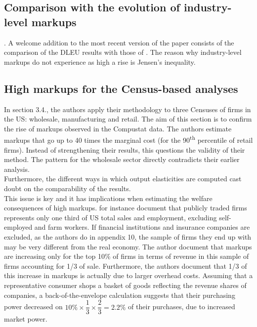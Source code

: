 \documentclass{amsart}
\theoremstyle{definition}
\theoremstyle{remark}
\numberwithin{equation}{section}
\begin{document}
\subsection*{Comparison with the evolution of industry-level markups}. A welcome addition to the most recent version of the paper consists of the comparison of the DLEU results with those of \cite{hall2018new}. The reason why industry-level markups do not experience as high a rise is Jensen's inequality.

\subsection*{High markups for the Census-based analyses} In section 3.4., the authors apply their methodology to three Censuses of firms in the US: wholesale, manufacturing and retail. The aim of this section is to confirm the rise of markups observed in the Compustat data. The authors estimate markups that go up to 40 times the marginal cost (for the 90\textsuperscript{th} percentile of retail firms). Instead of strengthening their results, this questions the validity of their method. The pattern for the wholesale sector directly contradicts their earlier analysis. \\

Furthermore, the different ways in which output elasticities are computed cast doubt on the comparability of the results.\\

This issue is key and it has implications when estimating the welfare consequences of high markups. \cite{davis2006volatility} for instance document that publicly traded firms represents only one third of US total sales and employment, excluding self-employed and farm workers. If financial institutions and insurance companies are excluded, as the authors do in appendix 10, the sample of firms they end up with may be very different from the real economy. The author document that markups are increasing only for the top 10\% of firms in terms of revenue in this sample of firms accounting for 1/3 of sale. Furthermore, the authors document that 1/3 of this increase in markups is actually due to larger overhead costs. Assuming that a representative consumer shops a basket of goods reflecting the revenue shares of companies, a back-of-the-envelope calculation suggests that their purchasing power decreased on $10\% \times \dfrac{1}{3} \times \dfrac{2}{3} = 2.2\%$ of their purchases, due to increased market power.\\
\end{document}
